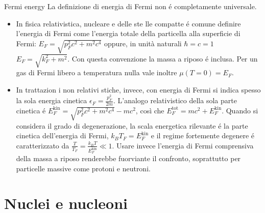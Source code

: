 \begin{frame}{Fermi energy}
La definizione di energia di Fermi non \'e completamente universale.
    \begin{itemize}
        \item In fisica relativistica, nucleare e delle ste lle compatte \'e comune definire l'energia di Fermi come l'energia totale della particella alla superficie di Fermi: $E_F=\sqrt{p_F^2c^2+m^2c^4}$ oppure, in unità naturali $\hbar=c=1$ $E_F=\sqrt{k_F^2+m^2}$.
Con questa convenzione la massa a riposo \'e inclusa. Per un gas di Fermi libero a temperatura nulla vale inoltre $\mu(T=0)=E_F$.
\item In trattazion i non relativi stiche, invece, con energia di Fermi si indica spesso la sola energia cinetica $\epsilon_F=\frac{p_F^2}{2m}$.
    L'analogo relativistico della sola parte cinetica \'e $E_F^{\mathrm{kin}}=\sqrt{p_F^2c^2+m^2c^4}-mc^2$, così che $E_F^{\mathrm{tot}}=mc^2+E_F^{\mathrm{kin}}$. Quando si considera il grado di degenerazione, la scala energetica rilevante \'e la parte cinetica dell'energia di Fermi, $k_B T_F = E_F^{\mathrm{kin}}$ e il regime fortemente degenere \'e caratterizzato da $\frac{T}{T_F}=\frac{k_B T}{E_F^{\mathrm{kin}}}\ll 1$. Usare invece l'energia di Fermi comprensiva della massa a riposo renderebbe fuorviante il confronto, soprattutto per particelle massive come protoni e neutroni.
    \end{itemize}
\end{frame}

\section{Nuclei e nucleoni}

